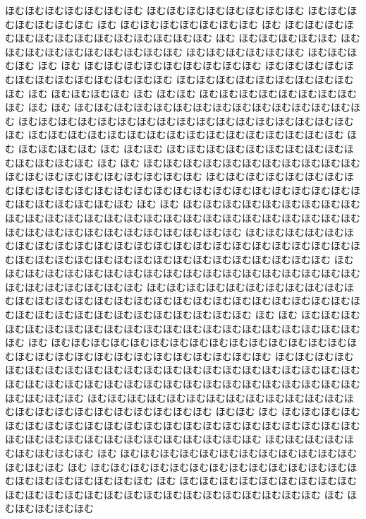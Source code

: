 \documentclass[a4paper]{article}
\begin{document}
\begin{prochomuhomu}{\NabeAzz}
ほむほむほむほむほむほむほむ ほむほむほむほむほむほむほむほむ ほむほむほむほむほむほむほむ ほむ ほむほむほむほむほむほむほむ ほむ ほむほむほむほむほむほむほむほむほむほむほむほむほむほむ ほむ ほむほむほむほむほむ ほむほむほむほむほむほむほむほむほむほむ ほむほむほむほむほむほむ ほむほむほむほむ ほむ ほむ ほむほむほむほむほむほむほむほむほむ ほむほむほむほむほむほむほむほむほむほむほむほむほむ ほむほむほむほむほむほむほむほむほむほむ ほむ ほむほむほむほむ ほむ ほむほむ ほむほむほむほむほむほむほむほむほむ ほむ ほむ ほむほむほむほむほむほむほむほむほむほむほむほむほむほむほむ ほむほむほむほむほむほむほむほむほむほむほむほむほむほむほむほむほむほむ ほむほむほむほむほむほむほむほむほむほむほむほむほむほむほむほむ ほむ ほむほむほむほむ ほむ ほむほむ ほむほむほむほむほむほむほむほむほむほむほむほむほむほむ ほむ ほむ ほむほむほむほむほむほむほむほむほむほむほむほむほむほむほむほむほむほむほむほむほむ ほむほむほむほむほむほむほむほむほむほむほむほむほむほむほむほむほむほむほむほむほむほむほむほむほむほむほむほむほむほむほむほむ ほむ ほむ ほむほむほむほむほむほむほむほむほむほむほむほむほむほむほむほむほむほむほむほむほむほむほむほむほむほむほむほむほむほむほむほむほむほむほむほむほむほむほむ ほむほむほむほむほむほむほむほむほむほむほむほむほむほむほむほむほむほむほむほむほむほむほむほむほむほむほむほむほむほむほむほむほむほむほむほむほむほむほむほむ ほむほむほむほむほむほむほむほむほむほむほむほむほむほむほむほむほむほむほむほむほむほむほむほむほむほむ ほむほむほむほむほむほむほむほむほむほむほむほむほむほむほむほむほむほむほむほむほむほむほむほむほむほむほむほむほむほむほむほむほむほむほむほむほむほむほむほむほむ ほむ ほむ ほむほむほむほむほむほむほむほむほむほむほむほむほむほむほむほむほむほむほむほむほむほむ ほむ ほむほむほむほむほむほむほむほむほむほむほむほむほむほむほむほむほむほむほむほむほむほむほむほむほむほむほむほむほむ ほむほむほむほむほむほむほむほむほむほむほむほむほむほむほむほむほむほむほむほむほむほむほむほむほむほむほむほむほむほむほむほむほむほむほむほむほむほむほむほむほむほむほむほむ ほむほむほむほむほむほむほむほむほむほむほむほむほむほむほむほむほむほむほむほむほむほむほむほむ ほむほむ ほむ ほむほむほむほむほむほむほむほむほむほむほむほむほむほむほむほむほむほむほむほむほむほむほむほむほむほむほむほむほむほむほむほむほむほむほむ ほむほむほむほむほむほむほむほむほむ ほむ ほむほむほむほむほむほむほむほむほむほむほむほむほむほむほむ ほむ ほむほむほむほむほむほむほむほむほむほむほむほむほむほむほむほむほむほむほむほむほむ ほむ ほむほむほむほむほむほむほむほむほむほむほむほむほむほむほむほむほむほむほむほむほむほむほむほむほむ ほむ ほむほむほむほむほむ

\end{prochomuhomu}
\end{document}
